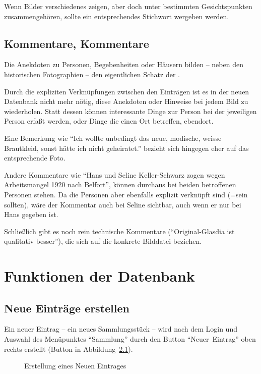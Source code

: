 \documentclass[12pt]{scrreprt}
\begin{document}
Wenn Bilder verschiedenes zeigen, aber doch unter bestimmten
Gesichtspunkten zusammengehören, sollte ein entsprechendes Stichwort
wergeben werden.

\section{Kommentare, Kommentare}

Die Anekdoten zu Personen, Begebenheiten oder Häusern bilden -- neben
den historischen Fotographien -- den eigentlichen Schatz der \DB{}.

Durch die expliziten Verknüpfungen zwischen den Einträgen ist es
in der neuen Datenbank nicht mehr nötig, diese Anekdoten oder Hinweise
bei jedem Bild zu wiederholen. Statt dessen können interessante
Dinge zur Person bei der jeweiligen Person erfaßt werden, oder
Dinge die einen Ort betreffen, ebendort.

Eine Bemerkung wie ``Ich wollte unbedingt das neue, modische, weisse
Brautkleid, sonst hätte ich nicht geheiratet.'' bezieht sich hingegen
eher auf das entsprechende Foto.

Andere Kommentare wie ``Hans und Seline Keller-Schwarz zogen wegen
Arbeitsmangel 1920 nach Belfort'', können durchaus bei beiden
betroffenen Personen stehen. Da die Personen aber ebenfalls explizit
verknüpft sind (=sein sollten), wäre der Kommentar auch bei Seline
sichtbar, auch wenn er nur bei Hans gegeben ist.

Schließlich gibt es noch rein technische Kommentare
(``Original-Glasdia ist qualitativ besser''), die sich auf die
konkrete Bilddatei beziehen. 


\chapter{Funktionen der Datenbank}
\section{Neue Einträge erstellen}

Ein neuer Eintrag -- ein neues Sammlungsstück -- wird nach dem Login und
Auswahl des Menüpunktes ``Sammlung'' durch den Button ``Neuer~Eintrag''
oben rechts erstellt (Button  in Abbildung~\ref{neuer-eintrag}).

\begin{figure}
  \caption{\label{neuer-eintrag} Erstellung eines Neuen Eintrages}
\end{figure}
\end{document}

